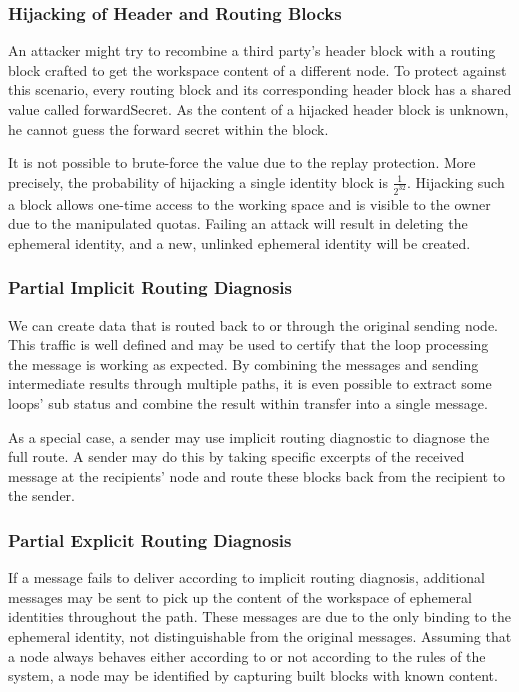 \subsubsection{Hijacking of Header and Routing Blocks}
An attacker might try to recombine a third party's header block with a routing block crafted to get the workspace content of a different node. To protect against this scenario, every routing block and its corresponding header block has a shared value called forwardSecret. As the content of a hijacked header block is unknown, he cannot guess the forward secret within the block.

It is not possible to brute-force the value due to the replay protection. More precisely, the probability of hijacking a single identity block is $\frac{1}{2^{32}}$. Hijacking such a block allows one-time access to the working space and is visible to the owner due to the manipulated quotas. Failing an attack will result in deleting the ephemeral identity, and a new, unlinked ephemeral identity will be created. 

\subsubsection{Partial Implicit Routing Diagnosis}
We can create data that is routed back to or through the original sending node. This traffic is well defined and may be used to certify that the loop processing the message is working as expected. By combining the messages and sending intermediate results through multiple paths, it is even possible to extract some loops' sub status and combine the result within transfer into a single message.

As a special case, a sender may use implicit routing diagnostic to diagnose the full route. A sender may do this by taking specific excerpts of the received message at the recipients' node and route these blocks back from the recipient to the sender. 

\subsubsection{Partial Explicit Routing Diagnosis}
If a message fails to deliver according to implicit routing diagnosis, additional messages may be sent to pick up the content of the workspace of ephemeral identities throughout the path. These messages are due to the only binding to the ephemeral identity, not distinguishable from the original messages. Assuming that a node always behaves either according to or not according to the rules of the system, a node may be identified by capturing built blocks with known content.

